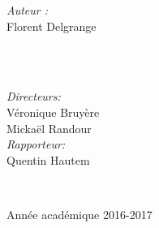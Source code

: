 \documentclass[12pt,a4paper]{report}
\theoremstyle{definition}%
\theoremstyle{remark}
\begin{document}
\begin{titlepage}
	\vspace{2cm}
	\begin{minipage}{0.4\textwidth}
		\begin{flushleft} \large
			\emph{Auteur :} \\Florent Delgrange
		\end{flushleft}
	\end{minipage}
	~
	\begin{minipage}{0.4\textwidth}
		\begin{flushright} \large
			\quad \\
			\emph{Directeurs:}\\ \quad Véronique Bruyère \\ \quad Mickaël Randour\\	\vspace*{0.5cm}
			\emph{Rapporteur:}\\
			Quentin Hautem
		\end{flushright}
		
	\end{minipage}\\[5cm]
	
	
	\vspace{4cm}
	\begin{center}
			Ann\'ee acad\'emique 2016-2017
	\end{center}
	
	
	\vspace*{1cm}

	
	
	\vfill %
	
\end{titlepage}
\end{document}
